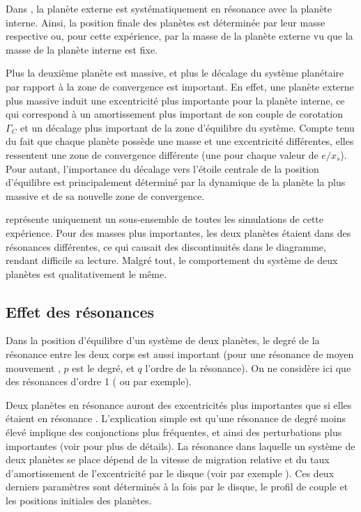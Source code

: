 \bigskip

Dans , la planète externe est systématiquement en résonance  avec la planète interne. Ainsi, la position finale des planètes est déterminée par leur masse respective ou, pour cette expérience, par la masse de la planète externe vu que la masse de la planète interne est fixe. 

Plus la deuxième planète est massive, et plus le décalage du système planétaire par rapport à la zone de convergence est
important. En effet, une planète externe plus massive induit une excentricité plus importante pour la planète interne, ce qui
correspond à un amortissement plus important de son couple de corotation $\Gamma_C$ et un décalage plus important de la zone
d'équilibre du système. Compte tenu du fait que chaque planète possède une masse et une excentricité différentes, elles
ressentent une zone de convergence différente (une pour chaque valeur de $e/x_s$). Pour autant, l'importance du décalage vers
l'étoile centrale de la position d'équilibre est principalement déterminé par la dynamique de la planète la plus massive et de
sa nouvelle zone de convergence.

\bigskip

 représente uniquement un sous-ensemble de toutes les simulations de cette expérience. Pour des
masses plus importantes, les deux planètes étaient dans des résonances différentes, ce qui causait des discontinuités dans le
diagramme, rendant difficile sa lecture. Malgré tout, le comportement du système de deux planètes est qualitativement le même.


\subsection{Effet des résonances}
Dans la position d'équilibre d'un système de deux planètes, le degré de la résonance entre les deux corps est aussi important (pour une résonance de moyen mouvement , $p$ est le degré, et $q$ l'ordre de la résonance). On ne considère ici que des résonances d'ordre 1 ( ou  par exemple).

Deux planètes en résonance  auront des excentricités plus importantes que si elles étaient en résonance . L'explication simple est qu'une résonance de degré moins élevé implique des conjonctions plus fréquentes, et ainsi des perturbations plus importantes (voir \cite{murray2000solar} pour plus de détails). La résonance dans laquelle un système de deux planètes se place dépend de la vitesse de migration relative et du taux d'amortissement de l'excentricité par le disque (voir par exemple \cite{mustill2011general}). Ces deux derniers paramètres sont déterminés à la fois par le disque, le profil de couple et les positions initiales des planètes. 

